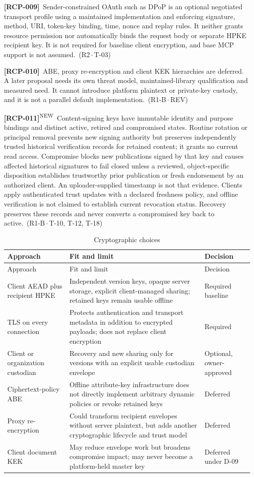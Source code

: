 \documentclass[11pt,a4paper]{article}
\newcommand{\reqtag}[2]{{\footnotesize\color{accent}(#1\,$\cdot$\,#2)}}
\newcommand{\req}[4]{\par\noindent\hypertarget{req:#1}{\textbf{[#1]}}\ #4\ \reqtag{#2}{#3}\par}
\newcommand{\reqn}[4]{\par\noindent\hypertarget{req:#1}{\textbf{[#1]}}\textsuperscript{\color{accent}\tiny NEW}\ #4\ \reqtag{#2}{#3}\par}
\begin{document}
\req{RCP-009}{R2}{T-03}{Sender-constrained OAuth such as DPoP is an optional negotiated transport profile using a maintained implementation and enforcing signature, method, URI, token-key binding, time, nonce and replay rules. It neither grants resource permission nor automatically binds the request body or separate HPKE recipient key. It is not required for baseline client encryption, and base MCP support is not assumed.}
\req{RCP-010}{R1-B}{REV}{ABE, proxy re-encryption and client KEK hierarchies are deferred. A later proposal needs its own threat model, maintained-library qualification and measured need. It cannot introduce platform plaintext or private-key custody, and it is not a parallel default implementation.}
\reqn{RCP-011}{R1-B}{T-10, T-12, T-18}{Content-signing keys have immutable identity and purpose bindings and distinct active, retired and compromised states. Routine rotation or principal removal prevents new signing authority but preserves independently trusted historical verification records for retained content; it grants no current read access. Compromise blocks new publications signed by that key and causes affected historical signatures to fail closed unless a reviewed, object-specific disposition establishes trustworthy prior publication or fresh endorsement by an authorized client. An uploader-supplied timestamp is not that evidence. Clients apply authenticated trust updates with a declared freshness policy, and offline verification is not claimed to establish current revocation status. Recovery preserves these records and never converts a compromised key back to active.}
\begin{longtable}{@{}P{0.23\textwidth}P{0.43\textwidth}P{0.20\textwidth}@{}}
\caption{Cryptographic choices}\label{tab:abe}\\
\toprule Approach & Fit and limit & Decision\\\midrule\endfirsthead
\toprule Approach & Fit and limit & Decision\\\midrule\endhead
Client AEAD plus recipient HPKE & Independent version keys, opaque server storage, explicit client-managed sharing; retained keys remain usable offline & Required baseline\\
TLS on every connection & Protects authentication and transport metadata in addition to encrypted payloads; does not replace client encryption & Required\\
Client or organization custodian & Recovery and new sharing only for versions with an explicit usable custodian envelope & Optional, owner-approved\\
Ciphertext-policy ABE & Offline attribute-key infrastructure does not directly implement arbitrary dynamic policies or revoke retained keys & Deferred\\
Proxy re-encryption & Could transform recipient envelopes without server plaintext, but adds another cryptographic lifecycle and trust model & Deferred\\
Client document KEK & May reduce envelope work but broadens compromise impact; may never become a platform-held master key & Deferred under D-09\\
\bottomrule
\end{longtable}
\end{document}
